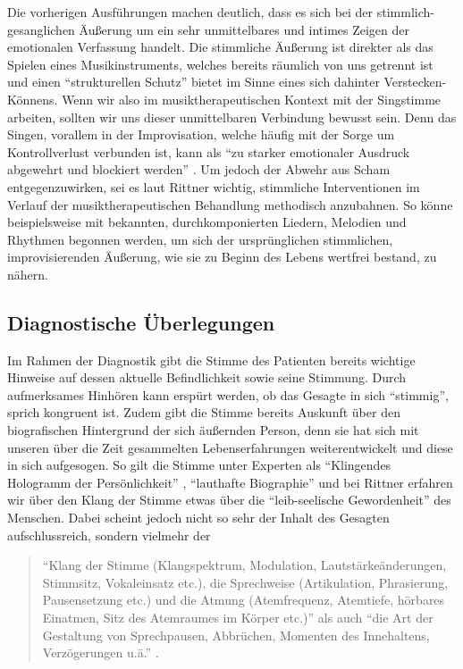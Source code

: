 Die vorherigen Ausführungen machen deutlich, dass es sich bei der stimmlich-gesanglichen Äußerung um ein sehr unmittelbares und intimes Zeigen der emotionalen Verfassung handelt. Die stimmliche Äußerung ist direkter als das Spielen eines Musikinstruments, welches bereits räumlich von uns getrennt ist und einen "`strukturellen Schutz"' \autocite[110]{rittner1990} bietet im Sinne eines sich dahinter Verstecken-Könnens. Wenn wir also im musiktherapeutischen Kontext mit der Singstimme arbeiten, sollten wir uns dieser unmittelbaren Verbindung bewusst sein. Denn das Singen, vorallem in der Improvisation, welche häufig mit der Sorge um Kontrollverlust verbunden ist, kann als "`zu starker emotionaler Ausdruck abgewehrt und blockiert werden"' \autocite[485]{rittner2009a}. Um jedoch der Abwehr aus Scham entgegenzuwirken, sei es laut Rittner wichtig, stimmliche Interventionen im Verlauf der musiktherapeutischen Behandlung methodisch anzubahnen. So könne beispielsweise mit bekannten, durchkomponierten Liedern, Melodien und Rhythmen begonnen werden, um sich der ursprünglichen stimmlichen, improvisierenden Äußerung, wie sie zu Beginn des Lebens wertfrei bestand, zu nähern. 

\subsection{Diagnostische Überlegungen}
\label{subsection:diagnostische_ueberlegungen}
Im Rahmen der Diagnostik gibt die Stimme des Patienten bereits wichtige Hinweise auf dessen aktuelle Befindlichkeit sowie seine Stimmung. Durch aufmerksames Hinhören kann erspürt werden, ob das Gesagte in sich "`stimmig"', sprich kongruent ist. Zudem gibt die Stimme bereits Auskunft über den biografischen Hintergrund der sich äußernden Person, denn sie hat sich mit unseren über die Zeit gesammelten Lebenserfahrungen weiterentwickelt und diese in sich aufgesogen. So gilt die Stimme unter Experten als "`Klingendes Hologramm der Persönlichkeit"' \autocite[222]{adamek1999}, "`lauthafte Biographie"' \autocite{gundermann1994} und bei Rittner erfahren wir über den Klang der Stimme etwas über die "`leib-seelische Gewordenheit"' \autocite[211]{rittner2008} des Menschen.
Dabei scheint jedoch nicht so sehr der Inhalt des Gesagten aufschlussreich, sondern vielmehr der 

\begin{quote}
\onehalfspacing
"`Klang der Stimme (Klangspektrum, Modulation, Lautstärkeänderungen, Stimmsitz, Vokaleinsatz etc.), die Sprechweise (Artikulation, Phrasierung, Pausensetzung etc.) und die Atmung (Atemfrequenz, Atemtiefe, hörbares Einatmen, Sitz des Atemraumes im Körper etc.)"' als auch "`die Art der Gestaltung von Sprechpausen, Abbrüchen, Momenten des Innehaltens, Verzögerungen u.ä."' \autocite[210]{rittner2008}. 
\end{quote}

